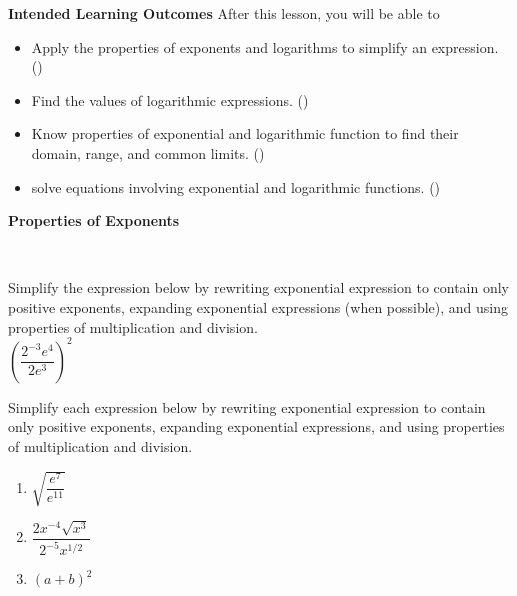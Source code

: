 \documentclass[10pt]{article}
\begin{document}
\pagestyle{otherpages}
\thispagestyle{firstpage}

\textbf{Intended Learning Outcomes}
After this lesson, you will be able to 

\begin{itemize}
    \item Apply the properties of exponents and logarithms to simplify an expression. ()
    \item Find the values of logarithmic expressions. ()
    \item Know properties of exponential and logarithmic function to find their domain, range, and common limits. ()
    \item solve equations involving exponential and logarithmic functions. ()
\end{itemize}

\vspace{-0.5cm}

\hrulefill


{\bf Properties of Exponents}


\,\hfill
{}
\hfill
{}
\hfill
{}
\hfill
{}
\hfill
{}
\hfill
{}
\hfill
\,


 Simplify the expression below by rewriting exponential expression to contain only positive exponents, expanding exponential expressions (when possible), and using properties of multiplication and division.\\

$\left( \dfrac{ 2^{-3}e^4 }{ 2e^3 } \right)^2$

\vfill

 Simplify each expression below by rewriting exponential expression to contain only positive exponents, expanding exponential expressions, and using properties of multiplication and division.

\begin{enumerate}
\item[(a)] $\sqrt{\dfrac{ e^{7} }{ e^{11} }}$
    \vfill
\item[(b)] $\dfrac{ 2x^{-4}\sqrt{x^{3}} }{ 2^{-5}x^{1/2} }$
    \vfill
\item[(c)] $(a+b)^2$
    \vfill
\end{enumerate}
\end{document}
